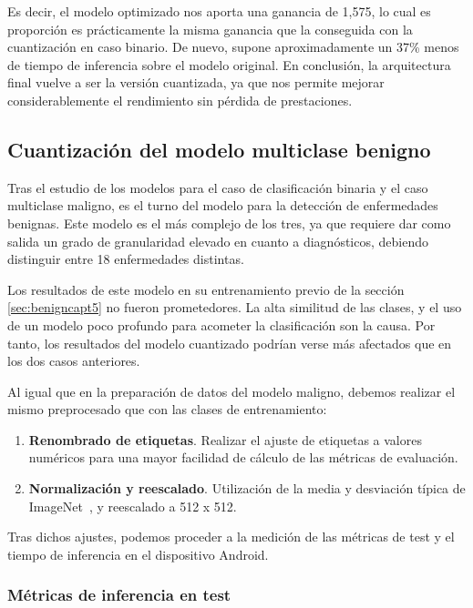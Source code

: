 Es decir, el modelo optimizado nos aporta una ganancia de 1,575, lo cual es proporción es prácticamente la misma ganancia que la conseguida con la cuantización en caso binario. De nuevo, supone aproximadamente un 37\% menos de tiempo de inferencia sobre el modelo original. 
En conclusión, la arquitectura final vuelve a ser la versión cuantizada, ya que nos permite mejorar considerablemente el rendimiento sin pérdida de prestaciones.

\subsection{Cuantización del modelo multiclase benigno}

Tras el estudio de los modelos para el caso de clasificación binaria y el caso multiclase maligno, es el turno del modelo para la detección de enfermedades benignas. Este modelo es el más complejo de los tres, ya que requiere dar como salida un grado de granularidad elevado en cuanto a diagnósticos, debiendo distinguir entre 18 enfermedades distintas.

Los resultados de este modelo en su entrenamiento previo de la sección  \ref{sec:benigncapt5} no fueron prometedores. La alta similitud de las clases, y el uso de un modelo poco profundo para acometer la clasificación son la causa. Por tanto, los resultados del modelo cuantizado podrían verse más afectados que en los dos casos anteriores.

Al igual que en la preparación de datos del modelo maligno, debemos realizar el mismo preprocesado que con las clases de entrenamiento:

\begin{enumerate}
	\item \textbf{Renombrado de etiquetas}. Realizar el ajuste de etiquetas a valores numéricos para una mayor facilidad de cálculo de las métricas de evaluación.
	\item \textbf{Normalización y reescalado}. Utilización de la media y desviación típica de ImageNet~\cite{5206848}, y reescalado a 512 x 512.
\end{enumerate}

Tras dichos ajustes, podemos proceder a la medición de las métricas de test y el tiempo de inferencia en el dispositivo Android.

\subsubsection{Métricas de inferencia en test}

